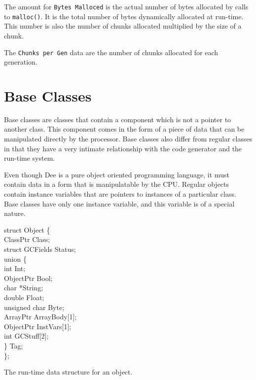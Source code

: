 The amount for {\tt Bytes Malloced} is the actual number of bytes
allocated by calls to {\tt malloc()}.  It is the total number of bytes
dynamically allocated at run-time.  This number is also the number of
chunks allocated multiplied by the size of a chunk.

The {\tt Chunks per Gen} data are the number of chunks allocated
for each generation.


\section{Base Classes}

Base classes are classes that contain a component which is not a
pointer to another class.  This component comes in the form of a piece
of data that can be manipulated directly by the processor.  Base
classes also differ from regular classes in that they have a very
intimate relationship with the code generator and the run-time system.

Even though Dee is a pure object oriented programming language, it
must contain data in a form that is manipulatable by the CPU.  Regular
objects contain instance variables that are pointers to instances of
a particular class.  Base classes have only one instance variable, and
this variable is of a special nature.

\begin{shortfigure}
\begin{prog}
\>   struct Object \{                \\
\>   ClassPtr  Class;                \\
\>   struct GCFields Status;         \\
\>   union \{                        \\
\>\>    int Int;                     \\
\>\>    ObjectPtr Bool;              \\
\>\>    char *String;                \\
\>\>    double Float;                \\
\>\>	unsigned char Byte;          \\
\>\>	ArrayPtr ArrayBody[1];       \\
\>\>    ObjectPtr InstVars[1];       \\
\>\>	int GCStuff[2];              \\
\>\>    \} Tag;                      \\
\>   \};
\end{prog}
\caption{The run-time data structure for an object.}
\label{fig:object2} 
\end{shortfigure}

